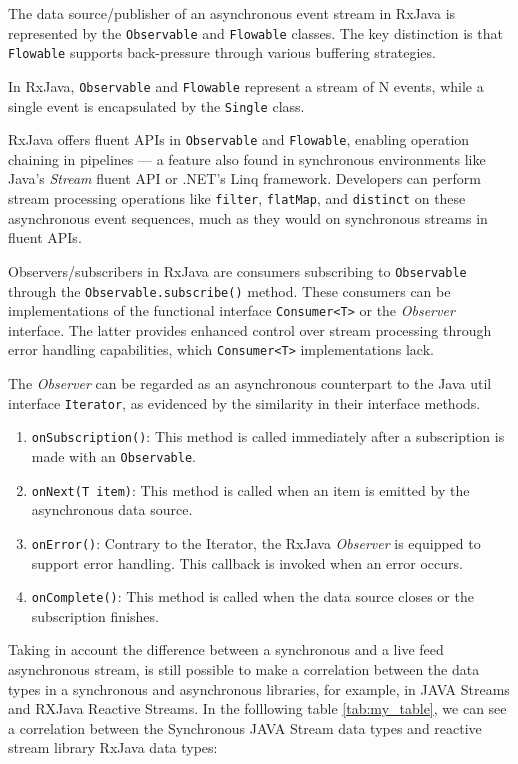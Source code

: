 The data source/publisher of an asynchronous event stream in RxJava is represented by the \texttt{Observable} and \texttt{Flowable} classes. The key distinction is that \texttt{Flowable} supports back-pressure through various buffering strategies.

In RxJava, \texttt{Observable} and \texttt{Flowable} represent a stream of N events, while a single event is encapsulated by the \texttt{Single} class.

RxJava offers fluent APIs in \texttt{Observable} and \texttt{Flowable}, enabling operation chaining in pipelines — a feature also found in synchronous environments like Java's \textit{Stream} fluent API or .NET's Linq framework. Developers can perform stream processing operations like \texttt{filter}, \texttt{flatMap}, and \texttt{distinct} on these asynchronous event sequences, much as they would on synchronous streams in fluent APIs.

Observers/subscribers in RxJava are consumers subscribing to \texttt{Observable} through the \texttt{Observable.subscribe()} method. These consumers can be implementations of the functional interface \texttt{Consumer<T>} or the \textit{Observer} interface. The latter provides enhanced control over stream processing through error handling capabilities, which \texttt{Consumer<T>} implementations lack.

The \textit{Observer} can be regarded as an asynchronous counterpart to the Java util interface \texttt{Iterator}, as evidenced by the similarity in their interface methods.
\begin{enumerate}
    \item \texttt{onSubscription()}: This method is called immediately after a subscription is made with an \texttt{Observable}.
    \item \texttt{onNext(T item)}: This method is called when an item is emitted by the asynchronous data source.
    \item \texttt{onError()}: Contrary to the Iterator, the RxJava \textit{Observer} is equipped to support error handling. This callback is invoked when an error occurs.
    \item \texttt{onComplete()}: This method is called when the data source closes or the subscription finishes.
\end{enumerate}

Taking in account the difference between a synchronous and a live feed asynchronous stream, is still possible to make a correlation between the data types in a synchronous and asynchronous libraries, for example, in JAVA Streams and RXJava Reactive Streams. In the folllowing table \ref{tab:my_table}, we can see a correlation between the Synchronous JAVA Stream data types and reactive stream library RxJava data types:


